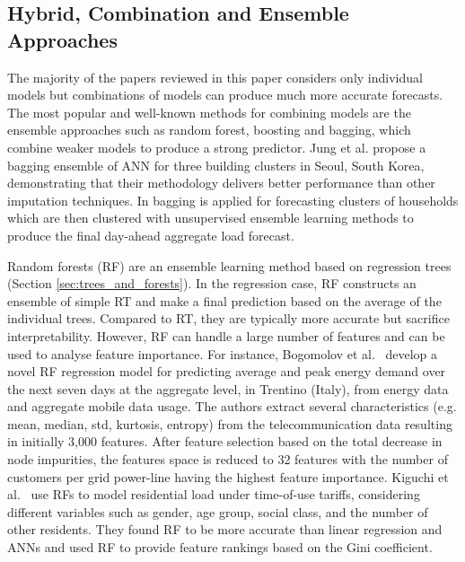 \subsection{Hybrid, Combination and Ensemble Approaches}
\label{hybridSection}
The majority of the papers reviewed in this paper considers only individual models but combinations of models can produce much more accurate forecasts. The most popular and well-known methods for combining models are the ensemble approaches such as random forest, boosting and bagging, which combine weaker models to produce a strong predictor. Jung et al. \cite{Jung2020bem} propose a bagging ensemble of ANN for three building clusters in Seoul, South Korea, demonstrating that their methodology delivers better performance than other imputation techniques. In \cite{Laurinec2019due} bagging is applied for forecasting clusters of households which are then clustered with unsupervised ensemble learning methods to produce the final day-ahead aggregate load forecast.

Random forests (RF) are an ensemble learning method based on regression trees (Section \ref{sec:trees_and_forests}). In the regression case, RF constructs an ensemble of simple RT and make a final prediction based on the average of the individual trees. Compared to RT, they are typically more accurate but sacrifice interpretability. However, RF can handle a large number of features and can be used to analyse feature importance. For instance, Bogomolov et al.~\cite{bogomolov2016ecp} develop a novel RF regression model for predicting average and peak energy demand over the next seven days at the aggregate level, in Trentino (Italy), from energy data and aggregate mobile data usage. The authors extract several characteristics (e.g. mean, median, std, kurtosis, entropy) from the telecommunication data resulting in initially 3,000 features. After feature selection based on the total decrease in node impurities, the features space is reduced to 32 features with the number of customers per grid power-line having the highest feature importance. Kiguchi et al.~\cite{Kiguchi2019pil} use RFs to model residential load under time-of-use tariffs, considering different variables such as gender, age group, social class, and the number of other residents. They found RF to be more accurate than linear regression and ANNs and used RF to provide feature rankings based on the Gini coefficient.

